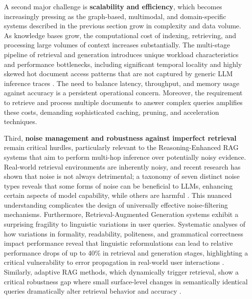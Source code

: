 \documentclass[11pt]{article}
\begin{document}
A second major challenge is \textbf{scalability and efficiency}, which becomes increasingly pressing as the graph-based, multimodal, and domain-specific systems described in the previous section grow in complexity and data volume. As knowledge bases grow, the computational cost of indexing, retrieving, and processing large volumes of context increases substantially. The multi-stage pipeline of retrieval and generation introduces unique workload characteristics and performance bottlenecks, including significant temporal locality and highly skewed hot document access patterns that are not captured by generic LLM inference traces \cite{ref63}. The need to balance latency, throughput, and memory usage against accuracy is a persistent operational concern. Moreover, the requirement to retrieve and process multiple documents to answer complex queries amplifies these costs, demanding sophisticated caching, pruning, and acceleration techniques.

Third, \textbf{noise management and robustness against imperfect retrieval} remain critical hurdles, particularly relevant to the Reasoning-Enhanced RAG systems that aim to perform multi-hop inference over potentially noisy evidence. Real-world retrieval environments are inherently noisy, and recent research has shown that noise is not always detrimental; a taxonomy of seven distinct noise types reveals that some forms of noise can be beneficial to LLMs, enhancing certain aspects of model capability, while others are harmful \cite{ref64}. This nuanced understanding complicates the design of universally effective noise-filtering mechanisms. Furthermore, Retrieval-Augmented Generation systems exhibit a surprising fragility to linguistic variations in user queries. Systematic analyses of how variations in formality, readability, politeness, and grammatical correctness impact performance reveal that linguistic reformulations can lead to relative performance drops of up to 40\% in retrieval and generation stages, highlighting a critical vulnerability to error propagation in real-world user interactions \cite{ref65}. Similarly, adaptive RAG methods, which dynamically trigger retrieval, show a critical robustness gap where small surface-level changes in semantically identical queries dramatically alter retrieval behavior and accuracy \cite{ref66}.
\end{document}
